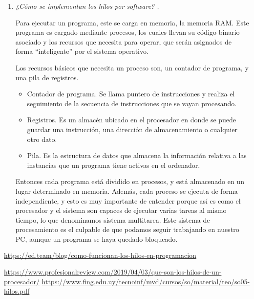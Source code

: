 \documentclass[a4paper,12pt]{article}
\begin{document}
\begin{enumerate}
\item {\it  ¿Cómo se implementan los hilos por software? .}

Para ejecutar un programa, este se carga en memoria, la memoria RAM. Este programa es cargado mediante procesos, los cuales llevan su código binario asociado y los recursos que necesita para operar, que serán asignados de forma “inteligente” por el sistema operativo.

Los recursos básicos que necesita un proceso son, un contador de programa, y una pila de registros.
\begin{itemize}
\item Contador de programa. Se llama puntero de instrucciones y realiza el seguimiento de la secuencia de instrucciones que se vayan procesando.



\item Registros. Es un almacén ubicado en el procesador en donde se puede guardar una instrucción, una dirección de almacenamiento o cualquier otro dato.

\item Pila. Es la estructura de datos que almacena la información relativa a las instancias que un programa tiene activas en el ordenador.




\end{itemize}
Entonces cada programa está dividido en procesos, y está almacenado en un lugar determinado en memoria. Además, cada proceso se ejecuta de forma independiente, y esto es muy importante de entender porque así es como el procesador y el sistema son capaces de ejecutar varias tareas al mismo tiempo, lo que denominamos sistema multitarea. Este sistema de procesamiento es el culpable de que podamos seguir trabajando en nuestro PC, aunque un programa se haya quedado bloqueado.

\end{enumerate}

\begin{thebibliography}{99}

\url{https://ed.team/blog/como-funcionan-los-hilos-en-programacion} 

\url{https://www.profesionalreview.com/2019/04/03/que-son-los-hilos-de-un-procesador/}
\url{https://www.fing.edu.uy/tecnoinf/mvd/cursos/so/material/teo/so05-hilos.pdf}



\end{thebibliography}
\end{document}
